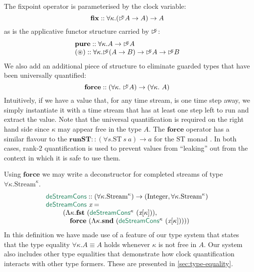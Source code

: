 \documentclass[natbib]{sigplanconf}
\newcommand{\elim}[1]{\textcolor{elim}{\textsf{#1}}}
\newcommand{\kw}[1]{\textbf{#1}}
\newcommand{\tyname}[1]{\textrm{#1}}
\newcommand{\ident}[1]{\textit{#1}}
\newcommand{\delay}[1]{\mathord{\rhd\kern-0.4em^{#1}}}
\begin{document}
The fixpoint operator is parameterised by the clock variable:
\begin{displaymath}
  \kw{fix} :: \forall \kappa. (\delay\kappa A \to A) \to A
\end{displaymath}
as is the applicative functor structure carried by $\delay\kappa$:
\begin{displaymath}
  \begin{array}{l}
    \kw{pure} :: \forall \kappa. A \to \delay\kappa A \\
    \kw{$(\circledast)$} :: \forall \kappa. \delay\kappa (A \to B) \to \delay\kappa A \to \delay\kappa B
  \end{array}
\end{displaymath}
We also add an additional piece of structure to eliminate guarded
types that have been universally quantified:
\begin{displaymath}
  \kw{force} :: (\forall \kappa.\ \delay\kappa A) \to (\forall \kappa.\ A)
\end{displaymath}
Intuitively, if we have a value that, for any time stream, is one time
step away, we simply instantiate it with a time stream that has at
least one step left to run and extract the value. Note that the
universal quantification is required on the right hand side since
$\kappa$ may appear free in the type $A$. The $\kw{force}$ operator
has a similar flavour to the $\kw{runST} :: (\forall s. \tyname{ST}\
s\ a) \to a$ for the $\tyname{ST}$ monad
\cite{DBLP:journals/jfp/MoggiS01,launchbury94lazy}. In both cases,
rank-2 quantification is used to prevent values from ``leaking'' out
from the context in which it is safe to use them.

Using $\kw{force}$ we may write a deconstructor for completed streams
of type $\forall \kappa. \tyname{Stream}^\kappa$.
\begin{displaymath}
  \begin{array}{l}
    \elim{deStreamCons} :: (\forall \kappa. \tyname{Stream}^\kappa) \to (\tyname{Integer}, \forall \kappa. \tyname{Stream}^\kappa) \\
    \elim{deStreamCons}\ \ident{x} = \\
    \quad\quad
    \begin{array}[t]{l}
      (\Lambda \kappa. \kw{fst}\ (\elim{deStreamCons}^\kappa\ (\ident{x}[\kappa])),\\
      \quad\kw{force}\ (\Lambda \kappa. \kw{snd}\ (\elim{deStreamCons}^\kappa\ (\ident{x}[\kappa]))))
    \end{array}
  \end{array}
\end{displaymath}
In this definition we have made use of a feature of our type system
that states that the type equality $\forall \kappa. A \equiv A$ holds
whenever $\kappa$ is not free in $A$. Our system also includes other
type equalities that demonstrate how clock quantification interacts
with other type formers. These are presented in
\autoref{sec:type-equality}.
\end{document}
